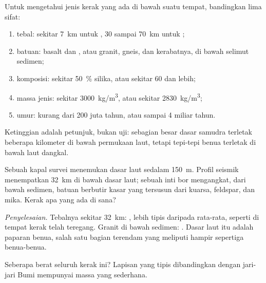\begin{method}\label{met:g12:continental-crust:compare}
Untuk mengetahui jenis kerak yang ada di bawah suatu tempat, bandingkan lima
sifat:
\begin{enumerate}
  \item tebal: sekitar \qty{7}{km} untuk , 30 sampai
        \qty{70}{km} untuk ;
  \item batuan: basalt dan , atau granit, gneis, dan kerabatnya, di
        bawah selimut sedimen;
  \item komposisi: sekitar \qty{50}{\percent} silika, atau sekitar 60 dan
        lebih;
  \item massa jenis: sekitar \qty{3000}{kg/m^3}, atau sekitar \qty{2830}{kg/m^3};
  \item umur: kurang dari 200 juta tahun, atau sampai 4 miliar tahun.
\end{enumerate}
Ketinggian adalah petunjuk, bukan uji: sebagian besar dasar samudra terletak
beberapa kilometer di bawah permukaan laut, tetapi tepi-tepi benua terletak di
bawah laut dangkal.
\end{method}

\begin{example}\label{ex:g12:continental-crust:shelf}
Sebuah kapal survei menemukan dasar laut sedalam \qty{150}{m}. Profil seismik
menempatkan  \qty{32}{km} di bawah dasar laut; sebuah inti bor mengangkat,
dari bawah sedimen, batuan berbutir kasar yang tersusun dari kuarsa, feldspar,
dan mika. Kerak apa yang ada di sana?

\emph{Penyelesaian.} Tebalnya sekitar \qty{32}{km}: , lebih tipis
daripada rata-rata, seperti di tempat kerak telah teregang. Granit di bawah
sedimen: . Dasar laut itu adalah paparan benua, salah satu bagian
terendam yang meliputi hampir sepertiga benua-benua.
\end{example}

Seberapa berat seluruh kerak ini? Lapisan yang tipis dibandingkan dengan jari-jari
Bumi mempunyai massa yang sederhana.

